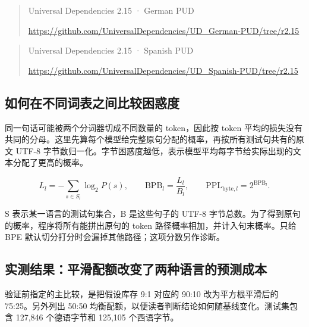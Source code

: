 \documentclass[11pt,a4paper]{article}
\newcommand{\BpeDocCodeInline}[1]{{\ttfamily #1}}
\newcommand{\BpeDocSubsection}[2]{\subsection{\texorpdfstring{#1}{#2}}}
\begin{document}
\begin{quote}\footnotesize\setlength{\parskip}{0pt} Universal Dependencies 2.15 · German PUD
\par\nobreak
\url{https://github.com/UniversalDependencies/UD_German-PUD/tree/r2.15}
\end{quote}


\begin{quote}\footnotesize\setlength{\parskip}{0pt} Universal Dependencies 2.15 · Spanish PUD
\par\nobreak
\url{https://github.com/UniversalDependencies/UD_Spanish-PUD/tree/r2.15}
\end{quote}


\BpeDocSubsection{如何在不同词表之间比较困惑度}{如何在不同词表之间比较困惑度}


同一句话可能被两个分词器切成不同数量的 \BpeDocCodeInline{token}，因此按 \BpeDocCodeInline{token} 平均的损失没有共同的分母。这里先算每个模型给完整原句分配的概率，再按所有测试句共有的原文 UTF-8 字节数归一化。字节困惑度越低，表示模型平均每字节给实际出现的文本分配了更高的概率。


\begin{equation}
L_l=-\sum_{s\in S_l}\log_2 P(s),\qquad \mathrm{BPB}_l=\frac{L_l}{B_l},\qquad \mathrm{PPL}_{\mathrm{byte},l}=2^{\mathrm{BPB}_l}.
\end{equation}


S 表示某一语言的测试句集合，B 是这些句子的 UTF-8 字节总数。为了得到原句的概率，程序将所有能拼出原句的 \BpeDocCodeInline{token} 路径概率相加，并计入句末概率。只给 BPE 默认切分打分时会漏掉其他路径；这项分数另作诊断。


\BpeDocSubsection{实测结果：平滑配额改变了两种语言的预测成本}{实测结果：平滑配额改变了两种语言的预测成本}


验证前指定的主比较，是把假设库存 9:1 对应的 90:10 改为平方根平滑后的 75:25。另外列出 50:50 均衡配额，以便读者判断结论如何随基线变化。测试集包含 127,846 个德语字节和 125,105 个西语字节。
\end{document}
